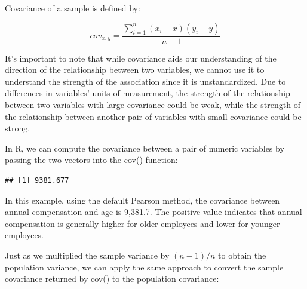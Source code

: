 \documentclass[]{book}
\newenvironment{Shaded}{\begin{snugshade}}{\end{snugshade}}
\newcommand{\CommentTok}[1]{\textcolor[rgb]{0.56,0.35,0.01}{\textit{#1}}}
\newcommand{\DataTypeTok}[1]{\textcolor[rgb]{0.13,0.29,0.53}{#1}}
\newcommand{\DecValTok}[1]{\textcolor[rgb]{0.00,0.00,0.81}{#1}}
\newcommand{\KeywordTok}[1]{\textcolor[rgb]{0.13,0.29,0.53}{\textbf{#1}}}
\newcommand{\NormalTok}[1]{#1}
\newcommand{\OperatorTok}[1]{\textcolor[rgb]{0.81,0.36,0.00}{\textbf{#1}}}
\newcommand{\StringTok}[1]{\textcolor[rgb]{0.31,0.60,0.02}{#1}}
\begin{document}
Covariance of a sample is defined by:

\[ cov_{x,y} = \frac{\displaystyle\sum_{i=1}^{n} (x_{i}-\bar{x})(y_{i}-\bar{y})}{n-1} \]

It's important to note that while covariance aids our understanding of the direction of the relationship between two variables, we cannot use it to understand the strength of the association since it is unstandardized. Due to differences in variables' units of measurement, the strength of the relationship between two variables with large covariance could be weak, while the strength of the relationship between another pair of variables with small covariance could be strong.

In R, we can compute the covariance between a pair of numeric variables by passing the two vectors into the cov() function:

\begin{Shaded}
\end{Shaded}

\begin{verbatim}
## [1] 9381.677
\end{verbatim}

In this example, using the default Pearson method, the covariance between annual compensation and age is 9,381.7. The positive value indicates that annual compensation is generally higher for older employees and lower for younger employees.

Just as we multiplied the sample variance by \((n - 1) / n\) to obtain the population variance, we can apply the same approach to convert the sample covariance returned by cov() to the population covariance:

\begin{Shaded}
\end{Shaded}
\end{document}
